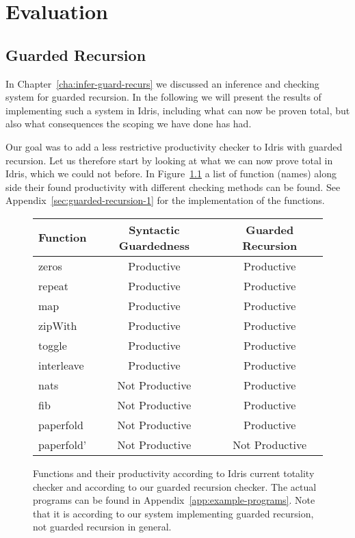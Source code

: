 \chapter{Evaluation}
\label{cha:evaluation}
\section{Guarded Recursion}
In Chapter~\ref{cha:infer-guard-recurs} we discussed an inference and checking
system for guarded recursion. In the following we will present the results of
implementing such a system in Idris, including what can now be proven total, but
also what consequences the scoping we have done has had.

Our goal was to add a less restrictive productivity checker to Idris with
guarded recursion. Let us therefore start by looking at what we can now prove
total in Idris, which we could not before. In
Figure~\ref{fig:productivity_table} a list of function (names) along side their
found productivity with different checking methods can be found. See
Appendix~\ref{sec:guarded-recursion-1} for the implementation of the functions.

\begin{figure}[h]
\begin{center}
  \begin{tabular}{| l | c | c |} \hline
    Function & Syntactic Guardedness & Guarded Recursion \\ \hline
    zeros & Productive & Productive \\ \hline
    repeat & Productive & Productive \\ \hline
    map & Productive & Productive \\ \hline
    zipWith & Productive & Productive \\ \hline
    toggle & Productive & Productive \\ \hline
    interleave & Productive & Productive \\ \hline
    nats & Not Productive & Productive \\ \hline
    fib & Not Productive & Productive \\ \hline
    paperfold & Not Productive & Productive \\ \hline
    paperfold' & Not Productive & Not Productive \\ \hline
  \end{tabular}
\end{center}
  \caption{Functions and their productivity according to Idris current totality
    checker and according to our guarded recursion checker. The actual programs
    can be found in Appendix~\ref{app:example-programs}. Note that it is
    according to our system implementing guarded recursion, not guarded
    recursion in general.}
  \label{fig:productivity_table}
\end{figure}

